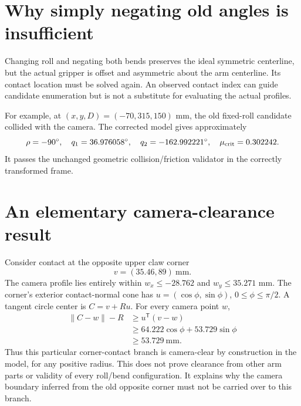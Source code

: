 \documentclass{article}
\begin{document}
\section{Why simply negating old angles is insufficient}
Changing roll and negating both bends preserves the ideal symmetric centerline, but the actual gripper is offset and asymmetric about the arm centerline. Its contact location must be solved again. An observed contact index can guide candidate enumeration but is not a substitute for evaluating the actual profiles.

For example, at $(x,y,D)=(-70,315,150)$ mm, the old fixed-roll candidate collided with the camera. The corrected model gives approximately
\[
\rho=-90^\circ,\quad q_1=36.976058^\circ,\quad q_2=-162.992221^\circ,
\quad \mu_{\rm crit}=0.302242.
\]
It passes the unchanged geometric collision/friction validator in the correctly transformed frame.

\section{An elementary camera-clearance result}
Consider contact at the opposite upper claw corner
\[
v=(35.46,89)\ \mathrm{mm}.
\]
The camera profile lies entirely within $w_x\leq-28.762$ and $w_y\leq35.271$ mm. The corner's exterior contact-normal cone has $u=(\cos\phi,\sin\phi)$, $0\leq\phi\leq\pi/2$. A tangent circle center is $C=v+Ru$. For every camera point $w$,
\[
\begin{aligned}
\|C-w\|-R
&\geq u^\mathsf T(v-w)\\
&\geq64.222\cos\phi+53.729\sin\phi\\
&\geq53.729\ \mathrm{mm}.
\end{aligned}
\]
Thus this particular corner-contact branch is camera-clear by construction in the model, for any positive radius. This does not prove clearance from other arm parts or validity of every roll/bend configuration. It explains why the camera boundary inferred from the old opposite corner must not be carried over to this branch.
\end{document}
